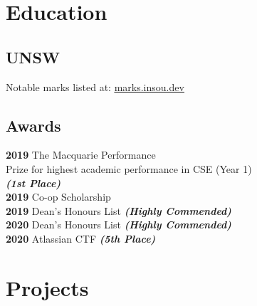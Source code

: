 \documentclass[a4paper]{deedy-resume}
\begin{document}
\begin{minipage}[t]{0.35\textwidth}


\section{Education} 

\subsection{UNSW}

Notable marks listed at:
\href{https://marks.insou.dev}{\underline{marks.insou.dev}}

\sectionspace

\subsection{Awards}

\textbf{2019}
The Macquarie Performance \\
Prize for highest academic performance
in CSE (Year 1) \\
{\footnotesize \textit{\textbf{(1st Place) }}} \\

\textbf{2019}
Co-op Scholarship \\

\textbf{2019}
Dean's Honours List
{\footnotesize \textit{\textbf{(Highly Commended) }}} \\

\textbf{2020}
Dean's Honours List
{\footnotesize \textit{\textbf{(Highly Commended) }}} \\

\textbf{2020}
Atlassian CTF
{\footnotesize \textit{\textbf{(5th Place) }}} \\

\sectionspace


\section{Projects}


\end{minipage}
\end{document}
